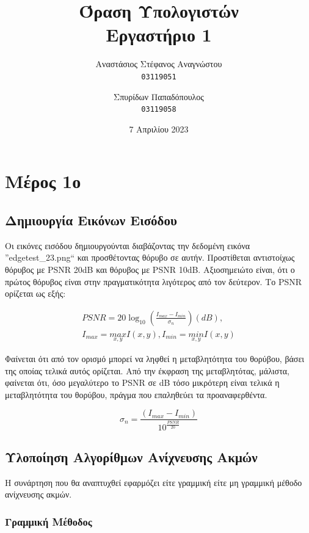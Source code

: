 \documentclass{article}
\title{Όραση Υπολογιστών\\
        \large Εργαστήριο 1}
\author{Αναστάσιος Στέφανος Αναγνώστου\\
    \texttt{03119051}
        \and
        Σπυρίδων Παπαδόπουλος\\
    \texttt{03119058}}
\date{7 Απριλίου 2023}
\newcommand{\eng}[1]{\foreignlanguage{english}{#1}}
\begin{document}
\maketitle

\section{Μέρος 1ο}

\subsection{Δημιουργία Εικόνων Εισόδου}

Οι εικόνες εισόδου δημιουργούνται διαβάζοντας την δεδομένη εικόνα ''\eng{edgetest\_23.png}`` και προσθέτοντας θόρυβο σε αυτήν. Προστίθεται αντιστοίχως θόρυβος με \eng{PSNR} 20\eng{dB} και θόρυβος με \eng{PSNR} 10\eng{dB}. Αξιοσημειώτο είναι, ότι ο πρώτος θόρυβος είναι στην πραγματικότητα λιγότερος από τον δεύτερον. Το \eng{PSNR} ορίζεται ως εξής:

\begin{equation}
    \begin{gathered}
        PSNR = 20\log_{10} \left(\frac{I_{max}-I_{min}}{\sigma_n} \right)(dB),\\
        I_{max} = \underset{x,y} {max} I(x,y), I_{min} = \underset{x,y} {min} I(x,y)
    \end{gathered}
\end{equation}

Φαίνεται ότι από τον ορισμό μπορεί να ληφθεί η μεταβλητότητα του θορύβου, βάσει της οποίας τελικά αυτός ορίζεται. Από την έκφραση της μεταβλητότας, μάλιστα, φαίνεται ότι, όσο μεγαλύτερο το \eng{PSNR} σε \eng{dB} τόσο μικρότερη είναι τελικά η μεταβλητότητα του θορύβου, πράγμα που επαληθεύει τα προαναφερθέντα.

\begin{equation}
    \sigma_n = \frac{\left(I_{max}-I_{min}\right)}{10^{\frac{PSNR}{20}}}
\end{equation}

\subsection{Υλοποίηση Αλγορίθμων Ανίχνευσης Ακμών}

Η συνάρτηση που θα αναπτυχθεί εφαρμόζει είτε γραμμική είτε μη γραμμική μέθοδο ανίχνευσης ακμών.

\subsubsection{Γραμμική Μέθοδος}
\end{document}
